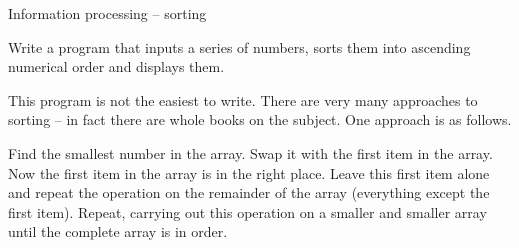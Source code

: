 			Information processing – sorting
			\begin{EXE}
				\item	{} Write a program that inputs a series of numbers, sorts them into ascending numerical order and displays them.
					
					This program is not the easiest to write. There are very many approaches to sorting – in fact there are whole books on the subject. One approach is as follows.
					
					Find the smallest number in the array. Swap it with the first item in the array. Now the first item in the array is in the right place. Leave this first item alone and repeat the operation on the remainder of the array (everything except the first item). Repeat, carrying out this operation on a smaller and smaller array until the complete array is in order.
			\end{EXE}

